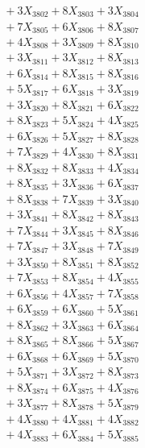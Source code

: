 \documentclass[a4paper,10pt]{article}
\begin{document}
{\begin{align}
&\;  + 3 X_{3802} + 8 X_{3803} + 3 X_{3804} \\[0.3ex]
&\;  + 7 X_{3805} + 6 X_{3806} + 8 X_{3807} \\[0.3ex]
&\;  + 4 X_{3808} + 3 X_{3809} + 8 X_{3810} \\[0.3ex]
&\;  + 3 X_{3811} + 3 X_{3812} + 8 X_{3813} \\[0.3ex]
&\;  + 6 X_{3814} + 8 X_{3815} + 8 X_{3816} \\[0.3ex]
&\;  + 5 X_{3817} + 6 X_{3818} + 3 X_{3819} \\[0.5ex]\allowbreak
&\;  + 3 X_{3820} + 8 X_{3821} + 6 X_{3822} \\[0.3ex]
&\;  + 8 X_{3823} + 5 X_{3824} + 4 X_{3825} \\[0.3ex]
&\;  + 6 X_{3826} + 5 X_{3827} + 8 X_{3828} \\[0.3ex]
&\;  + 7 X_{3829} + 4 X_{3830} + 8 X_{3831} \\[0.3ex]
&\;  + 8 X_{3832} + 8 X_{3833} + 4 X_{3834} \\[0.3ex]
&\;  + 8 X_{3835} + 3 X_{3836} + 6 X_{3837} \\[0.3ex]
&\;  + 8 X_{3838} + 7 X_{3839} + 3 X_{3840} \\[0.3ex]
&\;  + 3 X_{3841} + 8 X_{3842} + 8 X_{3843} \\[0.3ex]
&\;  + 7 X_{3844} + 3 X_{3845} + 8 X_{3846} \\[0.3ex]
&\;  + 7 X_{3847} + 3 X_{3848} + 7 X_{3849} \\[0.5ex]\allowbreak
&\;  + 3 X_{3850} + 8 X_{3851} + 8 X_{3852} \\[0.3ex]
&\;  + 7 X_{3853} + 8 X_{3854} + 4 X_{3855} \\[0.3ex]
&\;  + 6 X_{3856} + 4 X_{3857} + 7 X_{3858} \\[0.3ex]
&\;  + 6 X_{3859} + 6 X_{3860} + 5 X_{3861} \\[0.3ex]
&\;  + 8 X_{3862} + 3 X_{3863} + 6 X_{3864} \\[0.3ex]
&\;  + 8 X_{3865} + 8 X_{3866} + 5 X_{3867} \\[0.3ex]
&\;  + 6 X_{3868} + 6 X_{3869} + 5 X_{3870} \\[0.3ex]
&\;  + 5 X_{3871} + 3 X_{3872} + 8 X_{3873} \\[0.3ex]
&\;  + 8 X_{3874} + 6 X_{3875} + 4 X_{3876} \\[0.3ex]
&\;  + 3 X_{3877} + 8 X_{3878} + 5 X_{3879} \\[0.5ex]\allowbreak
&\;  + 4 X_{3880} + 4 X_{3881} + 4 X_{3882} \\[0.3ex]
&\;  + 4 X_{3883} + 6 X_{3884} + 5 X_{3885} \\[0.3ex]

\end{align}}
\end{document}
